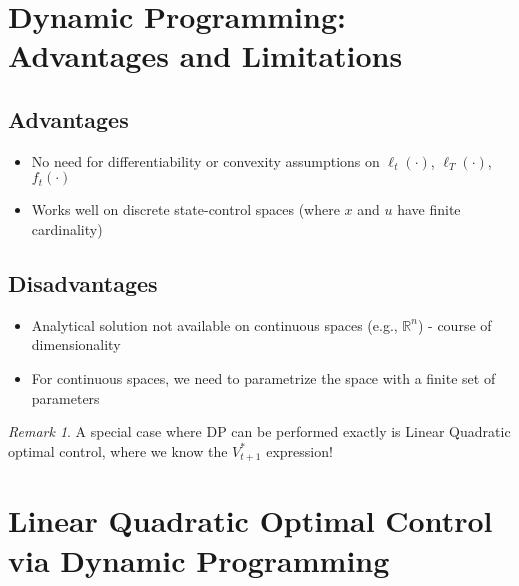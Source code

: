 \documentclass[openany]{book}
\newcommand{\R}{\mathbb{R}}               %
\theoremstyle{definition}
\theoremstyle{remark}
\newtheorem*{remark}{Remark}
\begin{document}
\section{Dynamic Programming: Advantages and Limitations}

\subsection{Advantages}
\begin{itemize}
    \item No need for differentiability or convexity assumptions on $\ell_t(\cdot)$, $\ell_T(\cdot)$, $f_t(\cdot)$
    \item Works well on discrete state-control spaces (where $x$ and $u$ have finite cardinality)
\end{itemize}

\subsection{Disadvantages}
\begin{itemize}
    \item Analytical solution not available on continuous spaces (e.g., $\R^n$) - course of dimensionality
    \item For continuous spaces, we need to parametrize the space with a finite set of parameters
\end{itemize}

\begin{remark}
A special case where DP can be performed exactly is Linear Quadratic optimal control, where we know the $V_{t+1}^*$ expression!
\end{remark}

\section{Linear Quadratic Optimal Control via Dynamic Programming}
\end{document}
